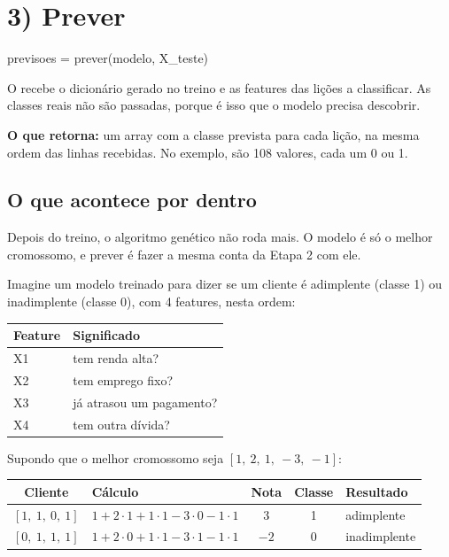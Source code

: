 \documentclass[11pt,a4paper]{article}
\newcommand{\code}[1]{\texttt{\detokenize{#1}}}
\newenvironment{tabela}{\par\nopagebreak[4]\vspace{0.3em}\nopagebreak[4]\begingroup\centering\small}{\par\endgroup\vspace{0.6em}}
\begin{document}
\clearpage
\section{3) Prever}

\begin{py}
previsoes = prever(modelo, X_teste)
\end{py}

O \code{prever} recebe o dicionário gerado no treino e as features das lições a classificar. As classes reais não são passadas, porque é isso que o modelo precisa descobrir.

\textbf{O que retorna:} um array com a classe prevista para cada lição, na mesma ordem das linhas recebidas. No exemplo, são 108 valores, cada um 0 ou 1.

\subsection{O que acontece por dentro}

Depois do treino, o algoritmo genético não roda mais. O modelo é só o melhor cromossomo, e prever é fazer a mesma conta da Etapa 2 com ele.

Imagine um modelo treinado para dizer se um cliente é adimplente (classe 1) ou inadimplente (classe 0), com 4 features, nesta ordem:

\begin{tabela}
\begin{tabular}{ll}
\toprule
Feature & Significado\\
\midrule
X1 & tem renda alta?\\
X2 & tem emprego fixo?\\
X3 & já atrasou um pagamento?\\
X4 & tem outra dívida?\\
\bottomrule
\end{tabular}
\end{tabela}

Supondo que o melhor cromossomo seja $[1,\ 2,\ 1,\ -3,\ -1]$:

\begin{tabela}
\begin{tabular}{clccl}
\toprule
Cliente & Cálculo & Nota & Classe & Resultado\\
\midrule
$[1,\ 1,\ 0,\ 1]$ & $1 + 2\cdot1 + 1\cdot1 - 3\cdot0 - 1\cdot1$ & 3 & 1 & adimplente\\
$[0,\ 1,\ 1,\ 1]$ & $1 + 2\cdot0 + 1\cdot1 - 3\cdot1 - 1\cdot1$ & $-2$ & 0 & inadimplente\\
\bottomrule
\end{tabular}
\end{tabela}
\end{document}
